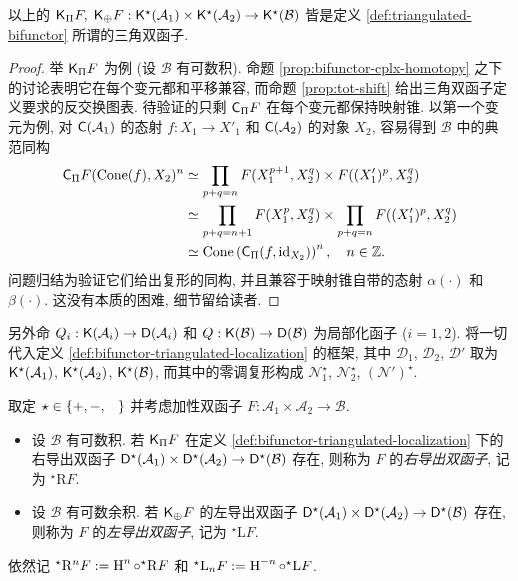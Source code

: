 \begin{proposition}
	以上的 $\mathsf{K}_{\Pi} F, \; \mathsf{K}_{\oplus} F: \mathsf{K}^\star(\mathcal{A}_1) \times \mathsf{K}^\star(\mathcal{A}_2) \to \mathsf{K}^\star(\mathcal{B})$ 皆是定义 \ref{def:triangulated-bifunctor} 所谓的三角双函子.
\end{proposition}
\begin{proof}
	举 $\mathsf{K}_{\Pi} F$ 为例 (设 $\mathcal{B}$ 有可数积). 命题 \ref{prop:bifunctor-cplx-homotopy} 之下的讨论表明它在每个变元都和平移兼容, 而命题 \ref{prop:tot-shift} 给出三角双函子定义要求的反交换图表. 待验证的只剩 $\mathsf{C}_{\Pi} F$ 在每个变元都保持映射锥. 以第一个变元为例, 对 $\mathsf{C}(\mathcal{A}_1)$ 的态射 $f: X_1 \to X'_1$ 和 $\mathsf{C}(\mathcal{A}_2)$ 的对象 $X_2$, 容易得到 $\mathcal{B}$ 中的典范同构
	\begin{align*}
		\mathsf{C}_{\Pi}F(\operatorname{Cone}(f), X_2)^n & \simeq \prod_{p+q=n} F(X_1^{p+1}, X_2^q ) \times F( (X'_1)^p, X_2^q ) \\
		& \simeq \prod_{p+q=n+1} F( X_1^p, X_2^q ) \times \prod_{p+q=n} F( (X'_1)^p, X_2^q ) \\
		& \simeq \operatorname{Cone}\left(\mathsf{C}_{\Pi}(f, \mathrm{id}_{X_2}) \right)^n , \quad n \in \mathbb{Z}.
	\end{align*}
	问题归结为验证它们给出复形的同构, 并且兼容于映射锥自带的态射 $\alpha(\cdot)$ 和 $\beta(\cdot)$. 这没有本质的困难, 细节留给读者.
\end{proof}

另外命 $Q_i: \mathsf{K}(\mathcal{A}_i) \to \mathsf{D}(\mathcal{A}_i)$ 和 $Q: \mathsf{K}(\mathcal{B}) \to \mathsf{D}(\mathcal{B})$ 为局部化函子 ($i=1,2$). 将一切代入定义 \ref{def:bifunctor-triangulated-localization} 的框架, 其中 $\mathcal{D}_1$, $\mathcal{D}_2$, $\mathcal{D}'$ 取为 $\mathsf{K}^\star(\mathcal{A}_1)$, $\mathsf{K}^\star(\mathcal{A}_2)$, $\mathsf{K}^\star(\mathcal{B})$, 而其中的零调复形构成 $\mathcal{N}_1^\star$, $\mathcal{N}_2^\star$, $(\mathcal{N}')^\star$.

\begin{definition}[导出双函子]\label{def:derived-bifunctor}
	 
	取定 $\star \in \{+, -, \hspace{0.8em}\}$ 并考虑加性双函子 $F: \mathcal{A}_1 \times \mathcal{A}_2 \to \mathcal{B}$.
	\begin{itemize}
		\item 设 $\mathcal{B}$ 有可数积. 若 $\mathsf{K}_{\Pi} F$ 在定义 \ref{def:bifunctor-triangulated-localization} 下的右导出双函子 $\mathsf{D}^\star(\mathcal{A}_1) \times \mathsf{D}^\star(\mathcal{A}_2) \to \mathsf{D}^\star(\mathcal{B})$ 存在, 则称为 $F$ 的\emph{右导出双函子}, 记为 ${}^\star \mathrm{R}F$.
		\item 设 $\mathcal{B}$ 有可数余积. 若 $\mathsf{K}_{\oplus} F$ 的左导出双函子 $\mathsf{D}^\star(\mathcal{A}_1) \times \mathsf{D}^\star(\mathcal{A}_2) \to \mathsf{D}^\star(\mathcal{B})$ 存在, 则称为 $F$ 的\emph{左导出双函子}, 记为 ${}^\star \mathrm{L}F$.
	\end{itemize}
	依然记 ${}^\star \mathrm{R}^n F := \operatorname{H}^n \circ {}^\star \mathrm{R}F$ 和 ${}^\star \mathrm{L}_n F := \operatorname{H}^{-n} \circ {}^\star \mathrm{L}F$.
\end{definition}

